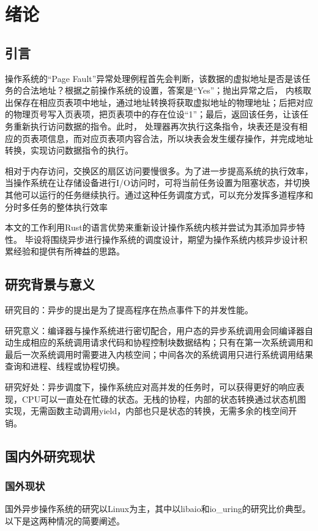 \chapter{绪论}
\label{chap:references}

\section{引言}

操作系统的“Page Fault”异常处理例程首先会判断，该数据的虚拟地址是否是该任务的合法地址？根据之前操作系统的设置，答案是“Yes”；抛出异常之后， 内核取出保存在相应页表项中地址，通过地址转换将获取虚拟地址的物理地址；后把对应的物理页号写入页表项，把页表项中的存在位设“1”；最后，返回该任务，让该任务重新执行访问数据的指令。此时， 处理器再次执行这条指令，块表还是没有相应的页表项信息，而对应页表项内容合法，所以块表会发生缓存操作，并完成地址转换，实现访问数据指令的执行。

相对于内存访问，交换区的扇区访问要慢很多。为了进一步提高系统的执行效率，当操作系统在让存储设备进行I/O访问时，可将当前任务设置为阻塞状态，并切换其他可以运行的任务继续执行。通过这种任务调度方式，可以充分发挥多道程序和分时多任务的整体执行效率

本文的工作利用Rust的语言优势来重新设计操作系统内核并尝试为其添加异步特性。 毕设将围绕异步进行操作系统的调度设计，期望为操作系统内核异步设计积累经验和提供有所裨益的思路。

\section{研究背景与意义}

研究目的：异步的提出是为了提高程序在热点事件下的并发性能。

研究意义：编译器与操作系统进行密切配合，用户态的异步系统调用会同编译器自动生成相应的系统调用请求代码和协程控制块数据结构；只有在第一次系统调用和最后一次系统调用时需要进入内核空间；中间各次的系统调用只进行系统调用结果查询和进程、线程或协程切换。

研究好处：异步调度下，操作系统应对高并发的任务时，可以获得更好的响应表现，CPU可以一直处在忙碌的状态。无栈的协程，内部的状态转换通过状态机图实现，无需函数主动调用yield，内部也只是状态的转换，无需多余的栈空间开销。

\section{国内外研究现状}

\subsection{国外现状}
国外异步操作系统的研究以Linux为主，其中以libaio和io\_uring的研究比价典型。以下是这两种情况的简要阐述。

